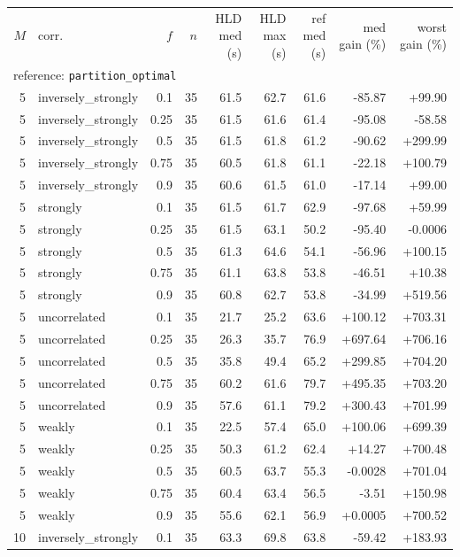 \begin{tabular}{rlrrrrrrr}
\hline
$M$ & corr. & $f$ & $n$ & HLD med (s) & HLD max (s) & ref med (s) & med gain (\%) & worst gain (\%) \\
\multicolumn{9}{l}{reference: \texttt{partition\_optimal}} \\
\hline
5 & inversely\_strongly & 0.1 & 35 & 61.5 & 62.7 & 61.6 & -85.87 & +99.90 \\
5 & inversely\_strongly & 0.25 & 35 & 61.5 & 61.6 & 61.4 & -95.08 & -58.58 \\
5 & inversely\_strongly & 0.5 & 35 & 61.5 & 61.8 & 61.2 & -90.62 & +299.99 \\
5 & inversely\_strongly & 0.75 & 35 & 60.5 & 61.8 & 61.1 & -22.18 & +100.79 \\
5 & inversely\_strongly & 0.9 & 35 & 60.6 & 61.5 & 61.0 & -17.14 & +99.00 \\
5 & strongly & 0.1 & 35 & 61.5 & 61.7 & 62.9 & -97.68 & +59.99 \\
5 & strongly & 0.25 & 35 & 61.5 & 63.1 & 50.2 & -95.40 & -0.0006 \\
5 & strongly & 0.5 & 35 & 61.3 & 64.6 & 54.1 & -56.96 & +100.15 \\
5 & strongly & 0.75 & 35 & 61.1 & 63.8 & 53.8 & -46.51 & +10.38 \\
5 & strongly & 0.9 & 35 & 60.8 & 62.7 & 53.8 & -34.99 & +519.56 \\
5 & uncorrelated & 0.1 & 35 & 21.7 & 25.2 & 63.6 & +100.12 & +703.31 \\
5 & uncorrelated & 0.25 & 35 & 26.3 & 35.7 & 76.9 & +697.64 & +706.16 \\
5 & uncorrelated & 0.5 & 35 & 35.8 & 49.4 & 65.2 & +299.85 & +704.20 \\
5 & uncorrelated & 0.75 & 35 & 60.2 & 61.6 & 79.7 & +495.35 & +703.20 \\
5 & uncorrelated & 0.9 & 35 & 57.6 & 61.1 & 79.2 & +300.43 & +701.99 \\
5 & weakly & 0.1 & 35 & 22.5 & 57.4 & 65.0 & +100.06 & +699.39 \\
5 & weakly & 0.25 & 35 & 50.3 & 61.2 & 62.4 & +14.27 & +700.48 \\
5 & weakly & 0.5 & 35 & 60.5 & 63.7 & 55.3 & -0.0028 & +701.04 \\
5 & weakly & 0.75 & 35 & 60.4 & 63.4 & 56.5 & -3.51 & +150.98 \\
5 & weakly & 0.9 & 35 & 55.6 & 62.1 & 56.9 & +0.0005 & +700.52 \\
10 & inversely\_strongly & 0.1 & 35 & 63.3 & 69.8 & 63.8 & -59.42 & +183.93 \\

\end{tabular}
